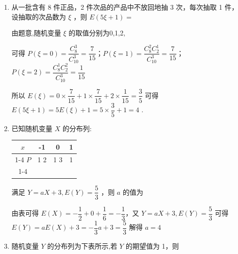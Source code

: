 \begin{enumerate}
\begin{enumerate}
\begin{jieda}
            于是 $E\left( X\right)  = 1 \times  P\left( {X = 1}\right)  + 2 \times  P\left( {X = 2}\right)  = {2a} = \dfrac{4}{3}$ .
            
            所以 $E\left( {\dfrac{1}{a}X}\right)  = \dfrac{3}{2}E\left( X\right)  = 2$ .
        \end{jieda}

        \item 从一批含有 8 件正品，2 件次品的产品中不放回地抽 3 次，每次抽取 1 件，设抽取的次品数为 $\xi$ ，则 $E\left( {{5\xi } + 1}\right)  =$
        \begin{jieda}
            由题意,随机变量 $\xi$ 的取值分别为0,1,2,
            
            可得 $P\left( {\xi  = 0}\right)  =
            \dfrac{C_8^3}{C_{10}^3}= \dfrac{7}{15}$；$P\left( {\xi  = 1}\right)  = \dfrac{C_8^2C_2^1}{C_{10}^3} = \dfrac{7}{15}$；$P\left( {\xi  = 2}\right)  = \dfrac{C_8^1C_2^2}{C_{10}^3} = \dfrac{1}{15}$
            
            所以 $E\left( \xi \right)  = 0 \times  \dfrac{7}{15} + 1 \times  \dfrac{7}{15} + 2 \times  \dfrac{1}{15} = \dfrac{3}{5}$ 可得 $E\left( {{5\xi } + 1}\right)  = {5E}\left( \xi \right)  + 1 = 5 \times  \dfrac{3}{5} + 1 = 4$ .
        \end{jieda}
        \item 已知随机变量 $X$ 的分布列:
        
        \begin{center}
        
        \begin{tabular}{|c|c|c|c|}
        \hline
        $x$ & -1 & 0 & 1 \\
        \cline{1-4}
        $P$ & 1 2 & 1 3 & 1 \\
        \cline{1-4}
        \hline
        \end{tabular}
        
        \end{center}
        
        满足 $Y = {aX} + 3,E\left( Y\right)  = \dfrac{5}{3}$ ，则 $a$ 的值为
        \begin{jieda}
            由表可得 $E\left( X\right)  =  - \dfrac{1}{2} + 0 + \dfrac{1}{6} =  - \dfrac{1}{3}$，又 $Y = {aX} + 3,E\left( Y\right)  = \dfrac{5}{3}$ 可得 $E\left( Y\right)  = {aE}\left( X\right)  + 3 =  - \dfrac{1}{3}a + 3 = \dfrac{5}{3}$ 解得 $a = 4$
        \end{jieda}

        \item 随机变量 $Y$ 的分布列为下表所示,若 $Y$ 的期望值为 1，则
        

\end{enumerate}
\end{enumerate}
